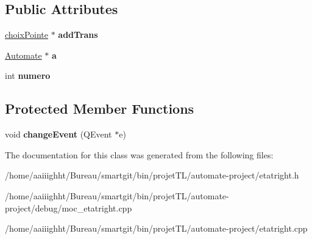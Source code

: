 \subsection*{Public Attributes}
\begin{DoxyCompactItemize}
\item 
\hypertarget{classetat_right_a1a3bbd118e907a6b9fe76ac22c702006}{\hyperlink{classchoix_pointe}{choix\-Pointe} $\ast$ {\bfseries add\-Trans}}\label{classetat_right_a1a3bbd118e907a6b9fe76ac22c702006}

\item 
\hypertarget{classetat_right_aa6d344e0bd745915bfb4ea0e767f0bc0}{\hyperlink{class_automate}{Automate} $\ast$ {\bfseries a}}\label{classetat_right_aa6d344e0bd745915bfb4ea0e767f0bc0}

\item 
\hypertarget{classetat_right_ab061da0425585fa691f3766e3e81708c}{int {\bfseries numero}}\label{classetat_right_ab061da0425585fa691f3766e3e81708c}

\end{DoxyCompactItemize}
\subsection*{Protected Member Functions}
\begin{DoxyCompactItemize}
\item 
\hypertarget{classetat_right_a0ca046ca45f51033a57401d90346dbec}{void {\bfseries change\-Event} (Q\-Event $\ast$e)}\label{classetat_right_a0ca046ca45f51033a57401d90346dbec}

\end{DoxyCompactItemize}


The documentation for this class was generated from the following files\-:\begin{DoxyCompactItemize}
\item 
/home/aaiiighht/\-Bureau/smartgit/bin/projet\-T\-L/automate-\/project/etatright.\-h\item 
/home/aaiiighht/\-Bureau/smartgit/bin/projet\-T\-L/automate-\/project/debug/moc\-\_\-etatright.\-cpp\item 
/home/aaiiighht/\-Bureau/smartgit/bin/projet\-T\-L/automate-\/project/etatright.\-cpp\end{DoxyCompactItemize}
